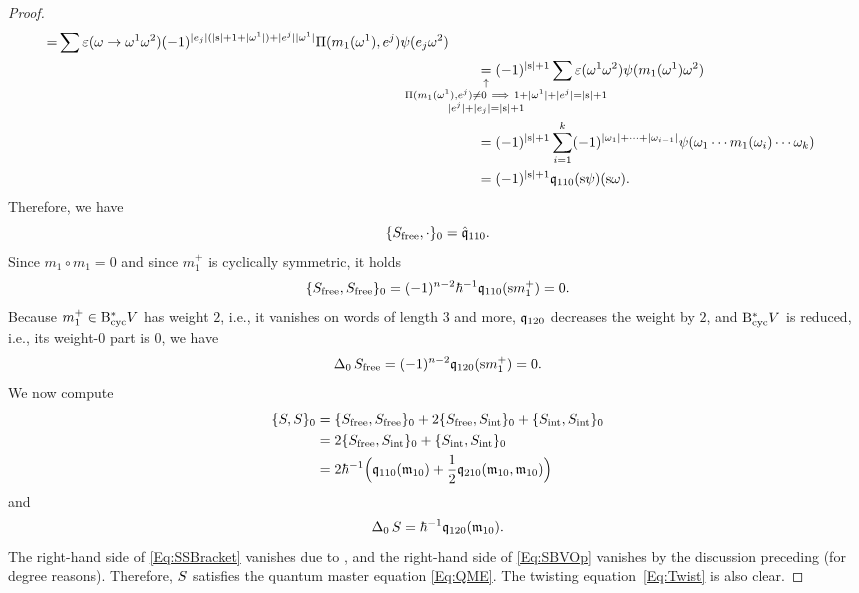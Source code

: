 \documentclass[\MainFolder/Text.tex]{subfiles}
\begin{document}
\begin{proof}
\begin{align}
{{{}}}{=} \sum \varepsilon(\omega\to\omega^1\omega^2)(-1)^{\Abs{e_j}(\Abs{\Susp}+1 + \Abs{\omega^1}) + \Abs{e^j}\Abs{\omega^1}} \Pair(m_1(\omega^1),e^j)\psi(e_j\omega^2) \nonumber\\
&\qquad\underset{\mathclap{\substack{\uparrow\rule{0pt}{1.5ex} \\ \hspace{1cm}\Pair(m_1(\omega^1),e^j)\neq 0\ \Implies\ 1 + \Abs{\omega^1} + \Abs{e^j} = \Abs{\Susp} + 1 \\ 
\Abs{e^j} + \Abs{e_j} = \Abs{\Susp} + 1
}}}{=} (-1)^{\Abs{\Susp} + 1} \sum \varepsilon(\omega^1 \omega^2) \psi(m_1(\omega^1)\omega^2) \nonumber\\
&\qquad = (-1)^{\Abs{\Susp} + 1} \sum_{i=1}^k (-1)^{\Abs{\omega_1} + \dotsb + \Abs{\omega_{i-1}}} \psi(\omega_1 \dotsb m_1(\omega_i) \dotsb \omega_k) \nonumber\\
&\qquad = (-1)^{\Abs{\Susp} + 1}\OPQ_{110}(\Susp \psi)(\Susp \omega).
\end{align}
Therefore, we have 
\begin{equation}\label{Eq:FreeActionBracket}
 \{S_{\mathrm{free}},\cdot\}_0 = \hat{\mathfrak{q}}_{110}.
\end{equation}
Since $m_1 \circ m_1 = 0$ and since $m_1^+$ is cyclically symmetric, it holds
\begin{equation*}
\{S_{\mathrm{free}},S_{\mathrm{free}}\}_0 = (-1)^{n-2}\hbar^{-1}\mathfrak{q}_{110}(\mathrm{s} m_1^+) = 0.
\end{equation*}
Because $m_1^+ \in \mathrm{B}_{\mathrm{cyc}}^* V$ has weight $2$, i.e., it vanishes on words of length $3$ and more, $\mathfrak{q}_{120}$ decreases the weight by $2$, and $\mathrm{B}_{\mathrm{cyc}}^* V$ is reduced, i.e., its weight-$0$ part is $0$, we have
\begin{equation*}
\operatorname{\Delta}_0 S_{\mathrm{free}} = (-1)^{n-2}\mathfrak{q}_{120}(\mathrm{s} m_1^+) = 0.
\end{equation*}
We now compute
\begin{equation}\label{Eq:SSBracket}\begin{aligned}
\{S,S\}_0 &= \{S_{\mathrm{free}},S_{\mathrm{free}}\}_0 + 2 \{S_{\mathrm{free}},S_{\mathrm{int}}\}_0 + \{S_{\mathrm{int}},S_{\mathrm{int}}\}_0 \\
& = 2 \{S_{\mathrm{free}},S_{\mathrm{int}}\}_0 + \{S_{\mathrm{int}},S_{\mathrm{int}}\}_0  \\
& = 2\hbar^{-1}\Bigl(\mathfrak{q}_{110}(\mathfrak{m}_{10}) + \frac{1}{2}\mathfrak{q}_{210}(\mathfrak{m}_{10},\mathfrak{m}_{10})\Bigr)
\end{aligned}\end{equation}
and
\begin{equation}\label{Eq:SBVOp}
 \operatorname{\Delta}_0 S = \hbar^{-1}\mathfrak{q}_{120}(\mathfrak{m}_{10}).
\end{equation}
The right-hand side of \eqref{Eq:SSBracket} vanishes due to \cite[Proposition~12.3]{Cieliebak2015}, and the right-hand side of \eqref{Eq:SBVOp} vanishes by the discussion preceding \cite[Proposition 12.5]{Cieliebak2015} (for degree reasons). Therefore, $S$ satisfies the quantum master equation \eqref{Eq:QME}.
The twisting equation~\eqref{Eq:Twist} is also clear.
\end{proof}
\end{document}
